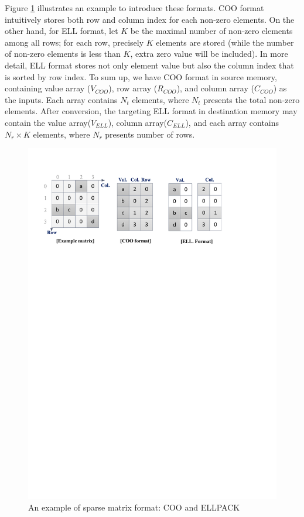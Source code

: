 \documentclass[10pt,journal,compsoc]{IEEEtran}
\begin{document}
Figure \ref{fig:SparseExample} illustrates an example to introduce these formats.
COO format intuitively stores both row and column index for each non-zero elements.
On the other hand, for ELL format, let $ K $ be the maximal number of non-zero elements among all rows;
for each row,  precisely $ K $ elements are stored (while the number of non-zero elements is less than $ K $,
extra zero value will be included). In more detail, ELL format stores not only element value but also the column index that is sorted by row index.
To sum up, we have COO format in source memory, containing value array ($ V_{COO} $), row array ($ R_{COO} $),
and column array ($ C_{COO} $) as the inputs. Each array contains $ N_{t} $ elements, where $ N_{t} $ presents the total non-zero elements.
After conversion, the targeting  ELL format in destination memory
may contain the value array($ V_{ELL} $), column array($ C_{ELL} $), and each array contains $ N_{r} \times K $ elements, where  $ N_{r}$
presents number of rows.
\begin{figure}[tpb]
\begin{center}
\graphicspath{{picture/}}
\includegraphics[scale=0.6]{SparseExample}
\caption{An example of sparse matrix format: COO and ELLPACK}
\label{fig:SparseExample}
\end{center}
\end{figure}
\end{document}
